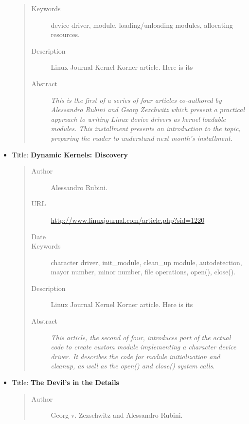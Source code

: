 \documentclass[a4paper,8pt,english]{sphinxmanual}
\begin{document}
\begin{itemize}
\begin{quote}
\begin{description}
\item[{Keywords}] \leavevmode
device driver, module, loading/unloading modules,
allocating resources.

\item[{Description}] \leavevmode
Linux Journal Kernel Korner article. Here is its

\item[{Abstract}] \leavevmode
\emph{This is the first of a series of four articles
co-authored by Alessandro Rubini and Georg Zezchwitz which present
a practical approach to writing Linux device drivers as kernel
loadable modules. This installment presents an introduction to the
topic, preparing the reader to understand next month's
installment}.

\end{description}\end{quote}

\item {} 
Title: \textbf{Dynamic Kernels: Discovery}
\begin{quote}\begin{description}
\item[{Author}] \leavevmode
Alessandro Rubini.

\item[{URL}] \leavevmode
\href{http://www.linuxjournal.com/article.php?sid=1220}{http://www.linuxjournal.com/article.php?sid=1220}

\item[{Date}] 

\item[{Keywords}] \leavevmode
character driver, init\_module, clean\_up module,
autodetection, mayor number, minor number, file operations,
open(), close().

\item[{Description}] \leavevmode
Linux Journal Kernel Korner article. Here is its

\item[{Abstract}] \leavevmode
\emph{This article, the second of four, introduces part of
the actual code to create custom module implementing a character
device driver. It describes the code for module initialization and
cleanup, as well as the open() and close() system calls}.

\end{description}\end{quote}

\item {} 
Title: \textbf{The Devil's in the Details}
\begin{quote}\begin{description}
\item[{Author}] \leavevmode
Georg v. Zezschwitz and Alessandro Rubini.


\end{description}
\end{quote}
\end{itemize}
\end{document}
